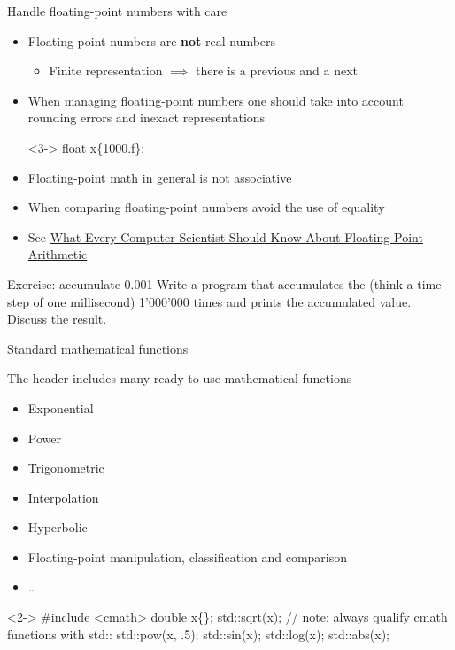 \begin{frame}[fragile]{Handle floating-point numbers with care}

  \begin{itemize}
  \item<1-> Floating-point numbers are \textbf{not} real numbers
    \begin{itemize}
    \item Finite representation $\implies$ there is a previous and a next
    \end{itemize}
  \item<2-> When managing floating-point numbers one should take into account
    rounding errors and inexact representations
    \begin{codeblock}<3->{
float x\{1\textquotesingle000.f\};
}\end{codeblock}
  \item<8-> Floating-point math in general is not associative
  \item<9-> When comparing floating-point numbers avoid the use of equality
  \item<10-> See \href{https://cr.yp.to/2005-590/goldberg.pdf}{What Every
      Computer Scientist Should Know About Floating Point Arithmetic}
 \end{itemize}

\end{frame}

\begin{frame}{Exercise: accumulate 0.001}
  Write a program that accumulates the   (think a time
  step of one millisecond) 1'000'000 times and prints the accumulated value.
  Discuss the result.
\end{frame}

\begin{frame}[fragile]{Standard mathematical functions}

  The \href{https://en.cppreference.com/w/cpp/header/cmath}{} header
  includes many ready-to-use mathematical functions
  \begin{itemize}
  \item Exponential
  \item Power
  \item Trigonometric
  \item Interpolation
  \item Hyperbolic
  \item Floating-point manipulation, classification and comparison
  \item \ldots
  \end{itemize}

  \begin{codeblock}<2->{
#include <cmath>
\ddd
double x\{\ddd\};
std::sqrt(x); // note: always qualify cmath functions with std::
std::pow(x, .5);
std::sin(x);
std::log(x);
std::abs(x);}\end{codeblock}
\end{frame}

